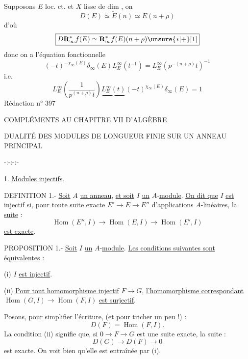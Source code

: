 Supposons $E$ loc. ct.  et $X$ lisse de dim  , on 
\[D(E)\simeq\check E(n)\simeq E(n+\rho)\]
d'où
\[\boxed{D\mathbf R_\infty^*f(E)\simeq\mathbf R_\infty^*f(E)(n+\rho)\unsure{*|+}[1]}\]
donc on a l'équation fonctionnelle
\[(-t)^{-\chi_\infty(E)}\delta_\infty(E)L_E^\infty(t^{-1})=L_E^\infty\left(p^{-(n+\rho)}t\right)^{-1}\]
i.e.
\[\boxed{L_E^\infty\left(\frac1{p^{(n+\rho)}t}\right)\underbrace{L_E^\infty(t)}(-t)^{\chi_\infty(E)}\delta_\infty(E)=1}\]
\hfill Rédaction n° 397
\begin{center}
COMPLÉMENTS AU CHAPITRE VII D'ALGÈBRE

DUALITÉ DES MODULES DE LONGUEUR FINIE SUR UN ANNEAU PRINCIPAL

-:-:-:-
\end{center}

1. \uline{Modules injectifs}.

DEFINITION 1.- \uline{Soit} $A$ \uline{un anneau}, \uline{et soit} $I$ \uline{un} $A$-\uline{module}. \uline{On dit que} $I$ \uline{est injectif si}, \uline{pour toute suite exacte} $E'\longrightarrow E\longrightarrow E''$ \uline{d'applications} $A$-\uline{linéaires}, \uline{la suite} :
\[\operatorname{Hom}(E'',I)\longrightarrow\operatorname{Hom}(E,I)\longrightarrow\operatorname{Hom}(E',I)\]
\uline{est exacte}.

PROPOSITION 1.- \uline{Soit} $I$ \uline{un} $A$-\uline{module}. \uline{Les conditions suivantes sont équivalentes} :

(i) $I$ \uline{est injectif}.

(ii) \uline{Pour tout homomorphisme injectif} $F\longrightarrow G$, \uline{l'homomorphisme correspondant} $\operatorname{Hom}(G,I)\longrightarrow\operatorname{Hom}(F,I)$ \uline{est surjectif}.

Posons, pour simplifier l'écriture, (et pour tricher un peu !) :
\[D(F)=\operatorname{Hom}(F,I).\]
La condition (ii) signifie que, si $0\longrightarrow F\longrightarrow G$ est une suite exacte, la suite :
\[D(G)\longrightarrow D(F)\longrightarrow0\]
est exacte. On voit bien qu'elle est entraînée par (i).


